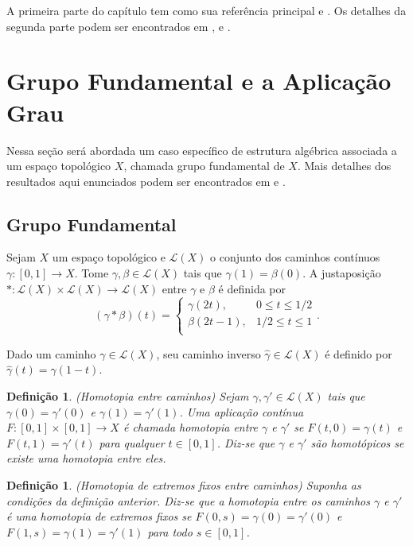 \documentclass[12pt]{book}
\newtheorem{definicao}[teorema]{Definição}
\newcommand{\caminhos}{\mathcal{L}}
\newcommand{\caminhossempontobase}[1]{\caminhos(#1)}
\newcommand{\funcaocond}[5]{
	#1 = 
	\left\{
	\begin{array}{cc}
		#2, & #3\\
		#4, & #5\\
	\end{array}
	\right.
}
\newcommand{\intervalo}{[0,1]}
\begin{document}
	A primeira parte do capítulo tem como sua referência principal \cite{elon_grupo_fundamental} e \cite{massey}. Os detalhes da segunda parte podem ser encontrados em \cite{banyaga_morse_homology}, \cite{elon_homologia} e \cite{vick_homology}.
		
	\section{Grupo Fundamental e a Aplicação Grau}\label{capitulo_grupo_fundamental}
	Nessa seção será abordada um caso específico de estrutura algébrica associada a um espaço topológico $X$, chamada grupo fundamental de $X$. Mais detalhes dos resultados aqui enunciados podem ser encontrados em \cite{elon_grupo_fundamental} e \cite{massey}.
	
	\subsection{Grupo Fundamental}
	
	Sejam $X$ um espaço topológico e $\caminhossempontobase{X}$ o conjunto dos caminhos contínuos $\gamma:[0,1]\to X$. Tome $\gamma, \beta \in \caminhossempontobase{X}$ tais que $\gamma(1) = \beta(0)$. A justaposição $*:\caminhossempontobase{X}\times \caminhossempontobase{X} \to \caminhossempontobase{X}$ entre $\gamma$ e $\beta$ é definida por
	$$
	\funcaocond{(\gamma*\beta)(t)}{\gamma(2t)}{0\leq t \leq 1/2}{\beta(2t-1)}{1/2 \leq t \leq 1}.
	$$
	
	Dado um caminho $\gamma\in \caminhossempontobase{X}$, seu caminho inverso $\hat{\gamma} \in \caminhossempontobase{X}$ é definido por $\hat{\gamma} (t) = \gamma(1-t)$.
	
	
	\begin{definicao}\label{definicao_caminhos_homotopicos}
		(Homotopia entre caminhos) Sejam $\gamma, \gamma' \in \caminhossempontobase{X}$ tais que $\gamma(0)=\gamma'(0)$ e $\gamma(1)=\gamma'(1)$. Uma aplicação contínua $F:\intervalo \times \intervalo \to X$ é chamada homotopia entre $\gamma$ e $\gamma'$ se $F(t, 0) = \gamma(t)$ e $F(t, 1) = \gamma'(t)$ para qualquer $t\in \intervalo$. Diz-se que  $\gamma$ e $\gamma'$ são homotópicos se existe uma homotopia entre eles.
	\end{definicao}
	
	\begin{definicao}\label{definicao_homotopia_extremos_fixos}
		(Homotopia de extremos fixos entre caminhos) Suponha as condições da definição anterior. Diz-se que a homotopia entre os caminhos $\gamma$ e $\gamma'$ é uma homotopia de extremos fixos se $F(0,s) = \gamma(0) = \gamma'(0)$ e $F(1,s) = \gamma(1) = \gamma'(1)$ para todo $s\in \intervalo$.
	\end{definicao}
	
\end{document}
